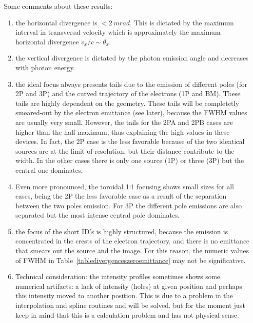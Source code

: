 \documentclass[a4paper,10pt]{article}
\begin{document}
Some comments about these results:
\begin{enumerate}
 \item the horizontal divergence is $< 2~mrad$. This is dictated by the maximum interval in transversal velocity which is approximately
 the maximum horizontal divergence $v_x/c \sim \theta_x$.
 \item the vertical divergence is dictated by the photon emission angle and decreases with photon energy.
 \item the ideal focus always presents tails due to the emission of different poles (for 2P and 3P) and the curved
 trajectory of the electrons (1P and BM). These tails are highly dependent on the geometry. These tails will be completetly smeared-out by
 the electron emittance (see later), because the FWHM values are usually very small. However, the tails for the 2PA and 2PB cases
 are higher than the half maximum, thus explaining the high values in these devices. 
 In fact, the 2P case is the less favorable because of the two identical sources are at the limit of resolution, but their distance contribute 
 to the width. In the other cases there is only one source (1P) or three (3P) but the central one dominates. 
 \item Even more pronounced, the toroidal 1:1 focusing shows small sizes for all cases, being the 2P the less favorable case as a result 
 of the separation between the two poles emission. For 3P the different pole emissions are also separated but the most intense central pole dominates.
 \item the focus of the short ID's is highly structured, because the emission is concentrated in the crests of the electron trajectory, 
and there is no emittance that smears out the source and the image. For this reason, the numeric values of FWHM in 
Table~\ref{tabledivergenceszeroemittance} may not be significative.
 \item Technical consideration: the intensity profiles sometimes shows some numerical artifacts: a lack of intensity (holes) at given position and
  perhaps this intensity moved to another position. This is due to a problem in the interpolation and spline routines and will be solved, but for the
  moment just keep in mind that this is a calculation problem and has not physical sense.


\end{enumerate}
\end{document}
